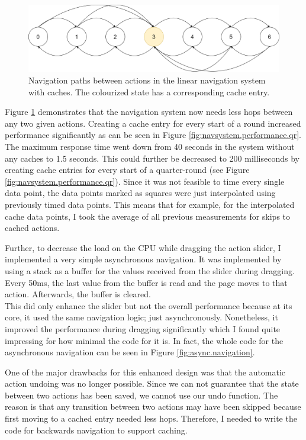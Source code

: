 \begin{figure}
\centering
\includegraphics[width=\textwidth]{figures/navigationsystem-diagram/navigationsystem-cache-overview-2.png}
\caption[Navigation paths in linear navigation system with caches]{Navigation paths between actions in the linear navigation system with caches. The colourized state has a corresponding cache entry.}
\label{fig:navsystem.cache.overview}
\end{figure}

Figure \ref{fig:navsystem.cache.overview} demonstrates that the navigation system now needs less hops between any two given actions. Creating a cache entry for every start of a round increased performance significantly as can be seen in Figure \ref{fig:navsystem.performance.qr}. The maximum response time went down from 40 seconds in the system without any caches to 1.5 seconds. This could further be decreased to 200 milliseconds by creating cache entries for every start of a quarter-round (see Figure \ref{fig:navsystem.performance.qr}). Since it was not feasible to time every single data point, the data points marked as squares were just interpolated using previously timed data points. This means that for example, for the interpolated cache data points, I took the average of all previous measurements for skips to cached actions.

Further, to decrease the load on the CPU while dragging the action slider, I implemented a very simple asynchronous navigation. It was implemented by using a stack as a buffer for the values received from the slider during dragging. Every 50ms, the last value from the buffer is read and the page moves to that action. Afterwards, the buffer is cleared. \\
This did only enhance the slider but not the overall performance because at its core, it used the same navigation logic; just asynchronously. Nonetheless, it improved the performance during dragging significantly which I found quite impressing for how minimal the code for it is. In fact, the whole code for the asynchronous navigation can be seen in Figure \ref{fig:async.navigation}.

One of the major drawbacks for this enhanced design was that the automatic action undoing was no longer possible. Since we can not guarantee that the state between two actions has been saved, we cannot use our undo function. The reason is that any transition between two actions may have been skipped because first moving to a cached entry needed less hops. Therefore, I needed to write the code for backwards navigation to support caching.

